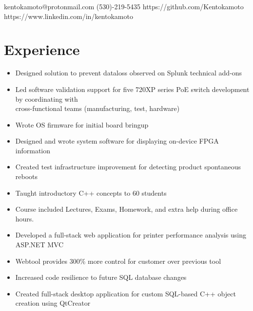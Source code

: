 \documentclass{Custom_CV}
\begin{document}
{kentokamoto@protonmail.com}
{}
{}
{(530)-219-5435}
{https://github.com/Kentokamoto}
{https://www.linkedin.com/in/kentokamoto}

\hfill %
\section{Experience}
\begin{itemize}[noitemsep]
    \item Designed solution to prevent dataloss observed on Splunk technical add-ons
\end{itemize}

\begin{itemize}[noitemsep]
    \item Led software validation support for five 720XP series PoE switch development by coordinating with\\ cross-functional teams (manufacturing, test, hardware)
    \item Wrote OS firmware for initial board bringup
    \item Designed and wrote system software for displaying on-device FPGA information
    \item Created test infrastructure improvement for detecting product spontaneous reboots
\end{itemize}

\begin{itemize}[noitemsep]
    \item Taught introductory C++ concepts to 60 students
    \item Course included Lectures, Exams, Homework, and extra help during office hours.
\end{itemize}
\begin{itemize}[rightmargin=\dimexpr\linewidth-15cm-\leftmargin\relax,noitemsep]
    \item Developed a full-stack web application for printer performance analysis using ASP.NET MVC
    \item Webtool provides 300\% more control for customer over previous tool
    \item Increased code resilience to future SQL database changes
\end{itemize}
\begin{itemize}[rightmargin=\dimexpr\linewidth-15cm-\leftmargin\relax,noitemsep]
\item Created full-stack desktop application for custom SQL-based C++ object creation using QtCreator
\end{itemize}
\end{document}
